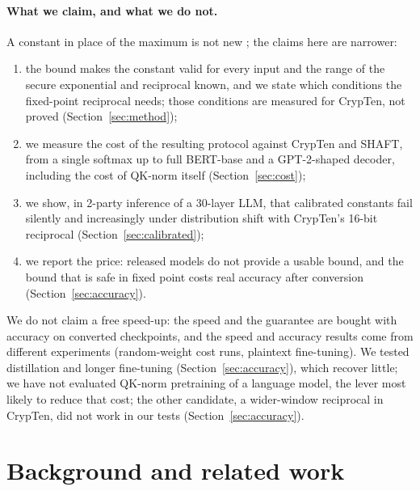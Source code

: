 \documentclass[11pt]{article}
\begin{document}
\paragraph{What we claim, and what we do not.}
A constant in place of the maximum is not new \cite{nexus_2025,thor_2025,arion_2025}; the
claims here are narrower:
\begin{enumerate}
\item the bound makes the constant valid for every input and the range of the secure exponential and reciprocal
known, and we state which conditions the fixed-point reciprocal needs; those conditions are measured for CrypTen, not
proved (Section~\ref{sec:method});
\item we measure the cost of the resulting protocol against CrypTen and SHAFT, from a single
softmax up to full BERT-base and a GPT-2-shaped decoder, including the cost of QK-norm itself
(Section~\ref{sec:cost});
\item we show, in 2-party inference of a 30-layer LLM, that calibrated constants fail silently
and increasingly under distribution shift with CrypTen's 16-bit reciprocal (Section~\ref{sec:calibrated});
\item we report the price: released models do not provide a usable bound, and the bound that is
safe in fixed point costs real accuracy after conversion (Section~\ref{sec:accuracy}).
\end{enumerate}
We do not claim a free speed-up: the speed and the guarantee are bought with accuracy on
converted checkpoints, and the speed and accuracy results come from different experiments (random-weight cost
runs, plaintext fine-tuning). We tested distillation and longer fine-tuning (Section~\ref{sec:accuracy}), which recover little; we have not evaluated
QK-norm pretraining of a language model, the lever most likely to reduce that cost; the other candidate, a wider-window reciprocal in CrypTen, did not work in our tests (Section~\ref{sec:accuracy}).

\section{Background and related work}
\end{document}
